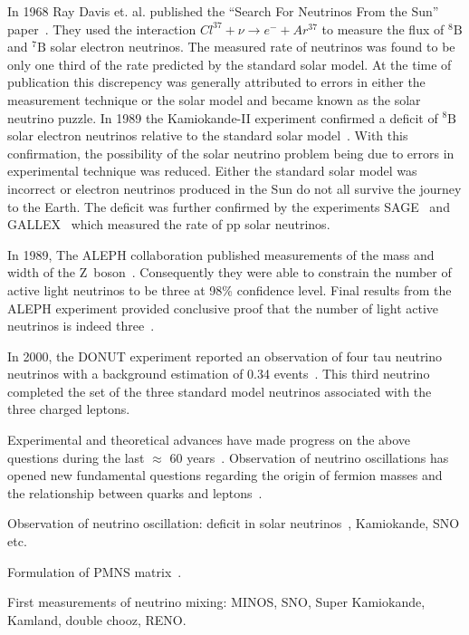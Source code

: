 In 1968 Ray Davis et. al. published the ``Search For Neutrinos From the
Sun'' paper~\cite{Davis:PhysRevLett.20.1205}. They used the
interaction $Cl^{37}+\nu \rightarrow e^- + Ar^{37}$ to measure the
flux of $^8\text{B}$ and $^7\text{B}$ solar
electron neutrinos. The measured rate of 
neutrinos was found to be only one third of the rate predicted by the
standard solar model. At the time of publication this discrepency was
generally 
attributed to errors in either the measurement technique or the solar
model and became known as the solar neutrino puzzle. In 1989 the
Kamiokande-II experiment confirmed a deficit of 
$^8\text{B}$ solar electron neutrinos relative to the standard solar
model~\cite{Kamiokande:PhysRevLett.63.16}. With this confirmation, the
possibility of the solar neutrino problem being due to errors in
experimental technique was reduced. Either the standard solar model
was incorrect or electron neutrinos produced in the Sun do not
all survive the journey to the Earth. The deficit was further
confirmed by the experiments SAGE~\cite{SAGE:PhysRevLett.67.3332} and
GALLEX~\cite{GALLEX:Anselmann:1992um} which measured the rate of pp
solar neutrinos. 



In 1989, The ALEPH collaboration published measurements of the mass
and width of the Z~boson~\cite{ZWidth:Decamp:1989tu}. Consequently
they were able to constrain the 
number of active light neutrinos to be three at 98\% confidence level.
Final results from the ALEPH experiment provided conclusive proof that
the number of light active neutrinos is indeed three~\cite{ALEPH:2005ab}.

In 2000, the DONUT experiment reported an observation of four tau
neutrino neutrinos with a background estimation of 0.34
events~\cite{nutau:Kodama:2000mp}. This third neutrino completed the
set of the three standard model neutrinos associated with the three
charged leptons. 






Experimental and theoretical advances have made progress on the above
questions during the last $\approx$ 60 years~\cite{pdg}. Observation of
neutrino oscillations has opened new fundamental questions regarding
the origin of fermion masses and the relationship between quarks and
leptons~\cite{Mohapatra:2005wg}. 


Observation of neutrino oscillation: deficit in solar
neutrinos~\cite{Davis:PhysRevLett.20.1205}, Kamiokande, SNO etc. 


Formulation of PMNS
matrix~\cite{Pontecorvo:1967fh, Gribov:1968kq, Maki:1962mu}. 


First measurements of neutrino mixing: MINOS, SNO, Super Kamiokande,
Kamland, double chooz, RENO.



